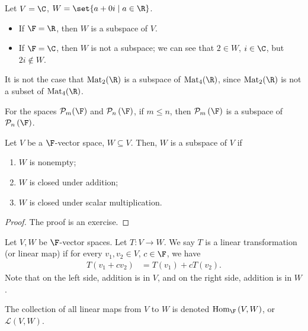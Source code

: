 \documentclass[12pt]{mypackage}
\begin{document}
\begin{example}[Subspaces of $\C$]
  Let $V = \C$, $W = \set{a + 0i\mid a\in \R}$.
  \begin{itemize}
    \item If $\F = \R$, then $W$ is a subspace of $V$.
    \item If $\F = \C$, then $W$ is not a subspace; we can see that $2\in W$, $i\in \C$, but $2i\notin W$.
  \end{itemize}
\end{example}
\begin{example}[Matrices]
  It is not the case that $\text{Mat}_2(\R)$ is a subspace of $\text{Mat}_4(\R)$, since $\text{Mat}_2(\R)$ is not a subset of $\text{Mat}_4(\R)$.
\end{example}
\begin{example}[Polynomials]
  For the spaces $\mathcal{P}_{m}(\F)$ and $\mathcal{P}_{n}\left(\F\right)$, if $m \leq n$, then $\mathcal{P}_{m}\left(\F\right)$ is a subspace of $\mathcal{P}_{n}\left(\F\right)$.
\end{example}
\begin{lemma}
  Let $V$ be a $\F$-vector space, $W\subseteq V$. Then, $W$ is a subspace of $V$ if
  \begin{enumerate}[(1)]
    \item $W$ is nonempty;
    \item $W$ is closed under addition;
    \item $W$ is closed under scalar multiplication.
  \end{enumerate}
\end{lemma}
\begin{proof}
  The proof is an exercise.
\end{proof}
\begin{definition}
  Let $V,W$ be $\F$-vector spaces. Let $T: V\rightarrow W$. We say $T$ is a linear transformation (or linear map) if for every $v_1,v_2\in V$, $c\in \F$, we have
  \begin{align*}
    T\left(v_1 + cv_2\right) &= T\left(v_1\right) + cT\left(v_2\right).
  \end{align*}
  Note that on the left side, addition is in $V$, and on the right side, addition is in $W$.\newline

  The collection of all linear maps from $V$ to $W$ is denoted $\text{Hom}_{\F}\left(V,W\right)$, or $\mathcal{L}\left(V,W\right)$.
\end{definition}
\end{document}
